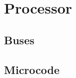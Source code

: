   
\fi

\mainmatter






\setcounter{chapter}{0}

\renewcommand{\thepart}{\Alph{part}}
\renewcommand{\thechapter}{\Alph{part}\arabic{chapter}}
\renewcommand{\thepage}{\Alph{part}\arabic{chapter}-\arabic{page}}
\renewcommand{\thefigure}{\Alph{part}\arabic{chapter}.\arabic{figure}}
\renewcommand{\thetable}{\Alph{part}\arabic{chapter}.\arabic{schematic}}
\renewcommand{\thepage}{\thepart\thechapter-\arabic{page}}

\ifdefined\renderpartprocessor
  \part{Processor}
  \glsresetall

  
  
  \chapter{Buses}
  \glsresetall
  
  
  \chapter{Microcode}
  \glsresetall
  \label{chap:microcode}
  
  
\fi

